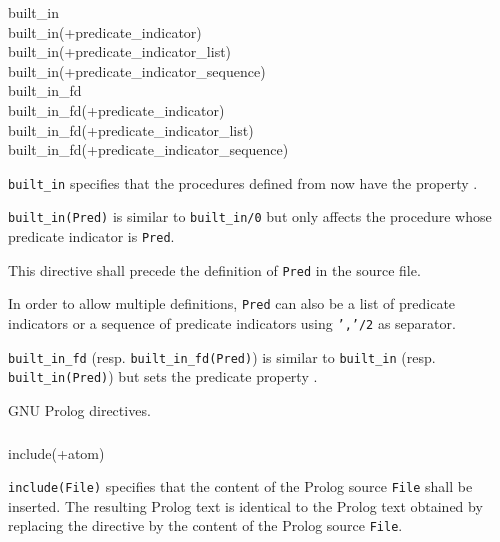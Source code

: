 \begin{TemplatesOneCol}
built\_in\\
built\_in(+predicate\_indicator)\\
built\_in(+predicate\_indicator\_list)\\
built\_in(+predicate\_indicator\_sequence)\\
built\_in\_fd\\
built\_in\_fd(+predicate\_indicator)\\
built\_in\_fd(+predicate\_indicator\_list)\\
built\_in\_fd(+predicate\_indicator\_sequence)

\end{TemplatesOneCol}

\Description

\texttt{built\_in} specifies that the procedures defined from
now have the  property .

\texttt{built\_in(Pred)} is similar to \texttt{built\_in/0} but
only affects the procedure whose predicate indicator is \texttt{Pred}.

This directive shall precede the definition of \texttt{Pred} in the source
file.

In order to allow multiple definitions, \texttt{Pred} can also be a list of
predicate indicators or a sequence of predicate indicators using
\texttt{','/2} as separator.

\texttt{built\_in\_fd} (resp.
\texttt{built\_in\_fd(Pred)}) is similar to
\texttt{built\_in} (resp. \texttt{built\_in(Pred)}) but sets the
 predicate property .

\Portability

GNU Prolog directives.

\subsubsection{}

\begin{TemplatesOneCol}
include(+atom)

\end{TemplatesOneCol}

\Description

\texttt{include(File)} specifies that the content of the Prolog source
\texttt{File} shall be inserted. The resulting Prolog text is identical to
the Prolog text obtained by replacing the directive by the content of the
Prolog source \texttt{File}.

